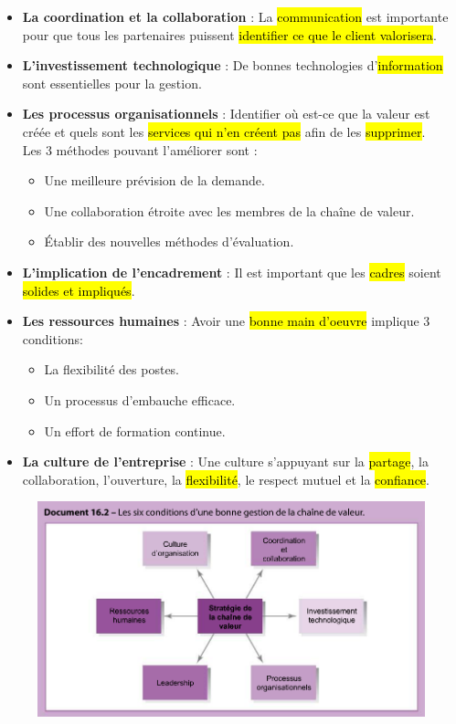 \documentclass[letterpaper, 12pt]{article}
\begin{document}
		\begin{itemize}
			\setlength{\itemsep}{0pt}
			\setlength{\parskip}{0pt}
			\setlength{\parsep}{0pt}
			\item \textbf{La coordination et la collaboration} : La \hl{communication} est importante pour 
				que tous les partenaires puissent \hl{identifier ce que le client valorisera}.
			\item \textbf{L'investissement technologique} : De bonnes technologies d'\hl{information} 
				sont essentielles pour la gestion.
			\item \textbf{Les processus organisationnels} : Identifier où est-ce que la valeur est créée
				et quels sont les \hl{services qui n'en cr\'eent pas} afin de les \hl{supprimer}. 
				\\Les 3 méthodes pouvant l'améliorer sont :
				\begin{itemize}
					\setlength{\itemsep}{0pt}
					\setlength{\parskip}{0pt}
					\setlength{\parsep}{0pt}
					\item Une meilleure prévision de la demande.
					\item Une collaboration étroite avec les membres de la chaîne de valeur.
					\item \'Etablir des nouvelles méthodes d'évaluation.
				\end{itemize}
			\item \textbf{L'implication de l'encadrement} : Il est important que les \hl{cadres} soient
				\hl{solides et impliqu\'es}.
			\item \textbf{Les ressources humaines} : Avoir une \hl{bonne main d'oeuvre} implique 3
				conditions:
				\begin{itemize}
					\setlength{\itemsep}{0pt}
					\setlength{\parskip}{0pt}
					\setlength{\parsep}{0pt}
					\item La flexibilité des postes.
					\item Un processus d'embauche efficace.
					\item Un effort de formation continue.
				\end{itemize}
			\item \textbf{La culture de l'entreprise} : Une culture s'appuyant sur la \hl{partage}, 
				la collaboration, l'ouverture, la \hl{flexibilit\'e}, le respect mutuel et la \hl{confiance}.
		\end{itemize}
		\begin{figure}[H]
			\centering
			\includegraphics[scale=0.8]{Images/chaine_valeur}
		\end{figure}\noindent
\end{document}
